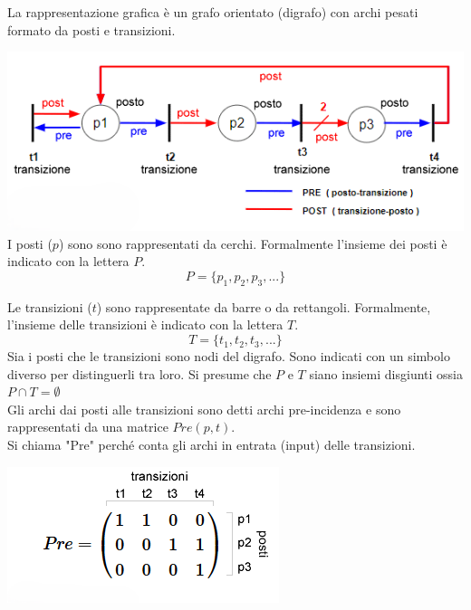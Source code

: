 \documentclass{article}
\begin{document}
La rappresentazione grafica è un grafo orientato (digrafo) con archi pesati formato da posti e transizioni.

\includegraphics{imgGrafi/rete-di-petri-spiegazione.png}\\

I posti ($p$) sono sono rappresentati da cerchi. Formalmente l'insieme dei posti è indicato con la lettera $P$.
\[
P = \{ p_1, p_2, p_3, ... \}
\]

Le transizioni ($t$) sono rappresentate da barre o da rettangoli. Formalmente, l'insieme delle transizioni è indicato con la lettera $T$.
\[
T = \{ t_1, t_2, t_3, ... \}
\]
Sia i posti che le transizioni sono nodi del digrafo. Sono indicati con un simbolo diverso per distinguerli tra loro. Si presume che $P$ e $T$ siano insiemi disgiunti ossia $P \cap T = \emptyset$ \\

Gli archi dai posti alle transizioni sono detti archi pre-incidenza e sono rappresentati da una matrice $Pre(p,t)$. \\
Si chiama "Pre" perché conta gli archi in entrata (input) delle transizioni.
\begin{center}
    \includegraphics{imgGrafi/matrice-pre-incidenza-esempio.png}
\end{center}
\end{document}

